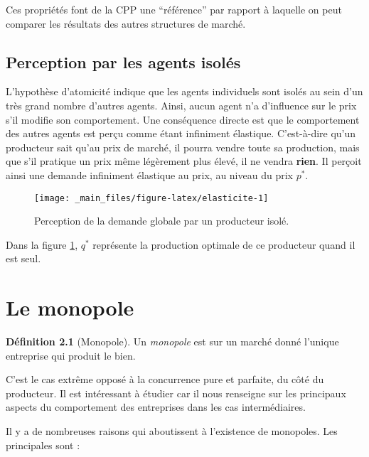 \documentclass[
  a4paper,
]{book}
\theoremstyle{definition}
\newtheorem{definition}{Définition}[chapter]
\theoremstyle{definition}
\theoremstyle{definition}
\theoremstyle{definition}
\theoremstyle{remark}
\begin{document}
Ces propriétés font de la CPP une ``référence'' par rapport à laquelle on peut comparer les résultats des autres structures de marché.

\hypertarget{perception-par-les-agents-isoluxe9s}{%
\section{Perception par les agents isolés}\label{perception-par-les-agents-isoluxe9s}}

L'hypothèse d'atomicité indique que les agents individuels sont isolés au sein d'un très grand nombre d'autres agents.
Ainsi, aucun agent n'a d'influence sur le prix s'il modifie son comportement.
Une conséquence directe est que le comportement des autres agents est perçu comme étant infiniment élastique.
C'est-à-dire qu'un producteur sait qu'au prix de marché, il pourra vendre toute sa production, mais que s'il pratique un prix même légèrement plus élevé, il ne vendra \textbf{rien}.
Il perçoit ainsi une demande infiniment élastique au prix, au niveau du prix \(p^*\).

\begin{figure}

{\centering \texttt{[image: \_main\_files/figure-latex/elasticite-1]} 

}

\caption{Perception de la demande globale par un producteur isolé.}\label{fig:elasticite}
\end{figure}

Dans la figure \ref{fig:elasticite}, \(q^*\) représente la production optimale de ce producteur quand il est seul.

\hypertarget{le-monopole}{%
\chapter{Le monopole}\label{le-monopole}}

\begin{definition}[Monopole]
Un \emph{monopole} est sur un marché donné l'unique entreprise qui produit le bien.
\end{definition}

C'est le cas extrême opposé à la concurrence pure et parfaite, du côté du producteur.
Il est intéressant à étudier car il nous renseigne sur les principaux aspects du comportement des entreprises dans les cas intermédiaires.

Il y a de nombreuses raisons qui aboutissent à l'existence de monopoles.
Les principales sont :
\end{document}
